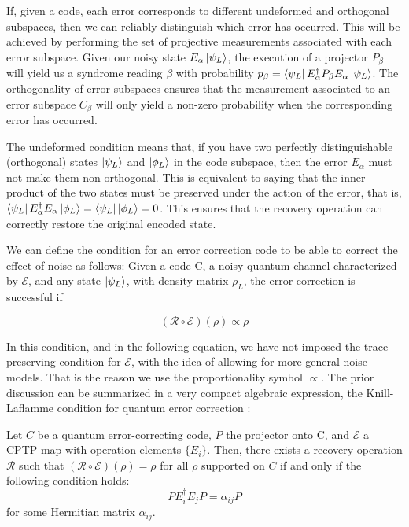 \documentclass[12pt, twoside, openany]{book}
\begin{document}
If, given a code, each error corresponds to different undeformed and orthogonal subspaces, then we can reliably distinguish which error has occurred. This will be achieved by performing the set of projective measurements associated with each error subspace. Given our noisy state $E_\alpha \ket{\psi_L}$, the execution of a projector $P_\beta$ will yield us a syndrome reading $\beta$ with probability $p_\beta = \bra{\psi_L} E_\alpha^\dagger P_\beta E_\alpha \ket{\psi_L}$. The orthogonality of error subspaces ensures that the measurement associated to an error subspace $C_\beta$ will only yield a non-zero probability when the corresponding error has occurred. 

The undeformed condition means that, if you have two perfectly distinguishable (orthogonal) states $\ket{\psi_L}$ and $\ket{\phi_L}$ in the code subspace, then the error $E_\alpha$ must not make them non orthogonal. This is equivalent to saying that the inner product of the two states must be preserved under the action of the error, that is, $\bra{\psi_L} E_\alpha^\dagger E_\alpha \ket{\phi_L} = \bra{\psi_L} \ket{\phi_L} = 0$. This ensures that the recovery operation can correctly restore the original encoded state. 

We can define the condition for an error correction code to be able to correct the effect of noise as follows: Given a code C, a noisy quantum channel characterized by $\mathcal{E}$, and any state $\ket{\psi_L}$, with density matrix $\rho_L$, the error correction is successful if 

\begin{equation} \label{QECgeneral}
    ( \mathcal{R} \circ \mathcal{E} ) (\rho) \propto \rho
\end{equation}

In this condition, and in the following equation, we have not imposed the trace-preserving condition for $\mathcal{E}$, with the idea of allowing for more general noise models. That is the reason we use the proportionality symbol $\propto$. The prior discussion can be summarized in a very compact algebraic expression, the Knill-Laflamme condition for quantum error correction \cite{Knill_2000}:

\begin{theorem} \label{Knill-Laflamme}
Let $C$ be a quantum error-correcting code, $P$ the projector onto C, and $\mathcal{E}$ a CPTP map with operation elements $\{E_i\}$. Then, there exists a recovery operation $\mathcal{R}$ such that $(\mathcal{R} \circ \mathcal{E})(\rho) = \rho$ for all $\rho$ supported on $C$ if and only if the following condition holds:
\begin{equation} \label{KL}
    P E_i^\dagger E_j P = \alpha_{ij} P
\end{equation}
for some Hermitian matrix $\alpha_{ij}$.
\end{theorem}
\end{document}
